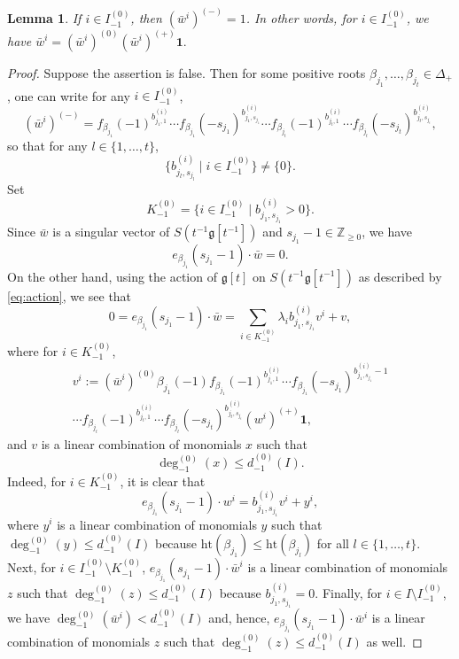 \documentclass[11pt]{article}
\numberwithin{equation}{section}
\let\be\beta
\newcommand\Z{{\mathbb Z}}
\newcommand \g{\mathfrak g}
\newtheorem{lem}[theorem]{Lemma}
\theoremstyle{definition}
\begin{document}
\begin{lem}
\label{lem:wi_-}
If $i\in I_{-1}^{(0)}$, then $(\bar w^i)^{(-)}=1$. In
other words, for $i \in I_{-1}^{(0)}$, we have
$\bar w^{i}= (\bar w^{i})^{(0)} (\bar w^{i})^{(+)} \mathbf{1}.$
\end{lem}
\begin{proof} Suppose the assertion is false.
Then for some positive roots $\beta_{j_1},\dots,\beta_{j_t} \in \Delta_+$,
one can write for any $i \in I_{-1}^{(0)}$,
\begin{equation}\label{e5}
(\bar w^i)^{(-)}=f_{\be_{j_1}}(-1)^{b_{j_1,1}^{(i)}}
\cdots f_{\be_{j_1}}(-s_{j_1})^{b_{j_1,s_{j_1}}^{(i)}}\cdots
f_{\be_{j_t}}(-1)^{b_{j_t,1}^{(i)}}
\cdots f_{\be_{j_t}}(-s_{j_t})^{b_{j_t,s_{j_t}}^{(i)}},
\end{equation}
so that for any $l \in \{1,\dots,t\}$,
\[
\{b_{j_l,s_{j_l}}^{(i)} \mid i \in I_{-1}^{(0)}\}\neq \{0\}.
\]
Set
\[
K_{-1}^{(0)} = \{i \in I_{-1}^{(0)} \mid b_{j_1,s_{j_1}}^{(i)}> 0 \}.
\]
Since $\bar w$ is a singular vector of $S(t^{-1}\g[t^{-1}])$ and $s_{j_1}-1 \in\Z_{\geq 0}$,
we have
\[
e_{\beta_{j_1}}(s_{j_1}-1)\cdot\bar w=0.
\]
On the other hand, using the action of $\g[t]$ on $S(t^{-1}\g[t^{-1}])$
as described by \eqref{eq:action}, we see that
\begin{equation}
\label{eq:wi_-}
0=e_{\beta_{j_1}}(s_{j_1}-1) \cdot\bar w =
\sum_{i \in K_{-1}^{(0)}} \lambda_ib_{j_1,s_{j_1}}^{(i)} v^{i} + v,
\end{equation}
where for $i \in K_{-1}^{(0)}$,
\begin{multline*}
v^{i}:=
(\bar w^{i})^{(0)} {\be_{j_1}(-1)}
f_{\be_{j_1}}(-1)^{b_{j_1,1}^{(i)}}
\cdots f_{\be_{j_1}}(-s_{j_1})^{b_{j_1,s_{j_1}}^{(i)}-1}\\
\cdots
f_{\be_{j_t}}(-1)^{b_{j_t,1}^{(i)}}
\cdots f_{\be_{j_t}}(-s_{j_t})^{b_{j_t,s_{j_t}}^{(i)}} (w^{i})^{(+)} \mathbf{1},
\end{multline*}
and $v$ is a linear combination of monomials $x$
such that
\[
\deg_{-1}^{(0)}(x) \leq d_{-1}^{(0)}(I).
\]
Indeed, for $i \in K_{-1}^{(0)}$, it is clear that
\begin{equation*}
e_{\beta_{j_1}}(s_{j_1}-1)\cdot w^{i} = b_{j_1,s_{j_1}}^{(i)} v^{i} + y^{i},
\end{equation*}
where $y^{i}$ is a linear combination of monomials $y$
such that
$\deg_{-1}^{(0)}(y) \leq d_{-1}^{(0)}(I)$ because
$\mathrm{ht}(\beta_{j_1}) \leq \mathrm{ht}(\beta_{j_l})$
for all $l \in \{1,\dots,t\}$.
Next, for $i \in I_{-1}^{(0)} \setminus K_{-1}^{(0)}$,
$e_{\beta_{j_1}} (s_{j_1}-1)\cdot\bar w^{i} $ is a
linear combination of monomials $z$ such that
$\deg_{-1}^{(0)}(z) \leq d_{-1}^{(0)}(I)$ because
$b_{j_1,s_{j_1}}^{(i)}=0$.
Finally, for $i \in I \setminus I_{-1}^{(0)}$, we have $\deg_{-1}^{(0)}(\bar w^{i}) < d_{-1}^{(0)}(I) $
and, hence, $e_{\beta_{j_1}}(s_{j_1}-1) \cdot\bar w^{i} $ is a
linear combination of monomials $z$ such that
$\deg_{-1}^{(0)}(z) \leq d_{-1}^{(0)}(I)$ as well.


\end{proof}
\end{document}
